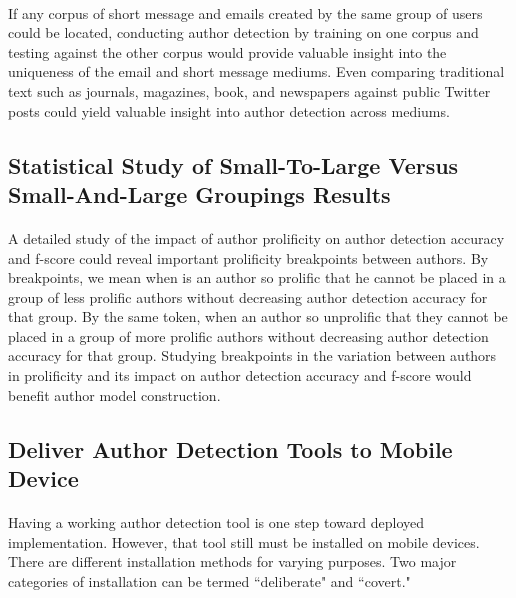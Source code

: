 	\paragraph*{} If any corpus of short message and emails created by the same group of users could be located, conducting author detection by training on one corpus and testing against the other corpus would provide valuable insight into the uniqueness of the email and short message mediums.  Even comparing traditional text such as journals, magazines, book, and newspapers against public Twitter posts could yield valuable insight into author detection across mediums.

	\begin{singlespace}
	\subsection{Statistical Study of Small-To-Large Versus Small-And-Large Groupings Results}
	\end{singlespace}
	\paragraph*{} A detailed study of the impact of author prolificity on author detection accuracy and f-score could reveal important prolificity breakpoints between authors.  By breakpoints, we mean when is an author so prolific that he cannot be placed in a group of less prolific authors without decreasing author detection accuracy for that group. By the same token, when an author so unprolific that they cannot be placed in a group of more prolific authors without decreasing author detection accuracy for that group. Studying breakpoints in the variation between authors in prolificity and its impact on author detection accuracy and f-score would benefit author model construction.

		\subsection{Deliver Author Detection Tools to Mobile Device}
			\paragraph*{} Having a working author detection tool is one step toward deployed implementation. However, that tool still must be installed on mobile devices.  There are different installation methods for varying purposes.  Two major categories of installation can be termed ``deliberate" and ``covert."
